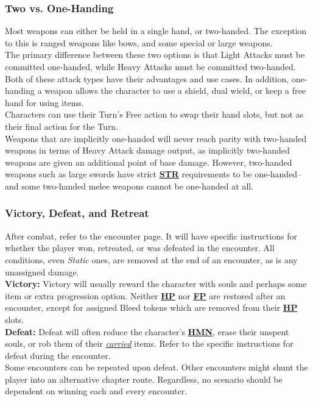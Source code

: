 \documentclass[12pt]{article}
\newcommand{\refto}[1]{\hyperlink{#1}{\textbf{#1}}}
\newcommand{\reftoit}[1]{\hyperlink{#1}{\emph{#1}}}
\begin{document}
\begin{multicols*}{2}
\subsubsection{Two vs. One-Handing}
Most weapons can either be held in a single hand, or two-handed. The exception to this is ranged weapons like bows, and some special or large weapons.\\
The primary difference between these two options is that Light Attacks must be committed one-handed, while Heavy Attacks must be committed two-handed. Both of these attack types have their advantages and use cases. In addition, one-handing a weapon allows the character to use a shield, dual wield, or keep a free hand for using items.\\
Characters can use their Turn’s Free action to swap their hand slots, but not as their final action for the Turn.\\
Weapons that are implicitly one-handed will never reach parity with two-handed weapons in terms of Heavy Attack damage output, as implicitly two-handed weapons are given an additional point of base damage. However, two-handed weapons such as large swords have strict \refto{STR} requirements to be one-handed--and some two-handed melee weapons cannot be one-handed at all.

\subsubsection{Victory, Defeat, and Retreat}
After combat, refer to the encounter page. It will have specific instructions for whether the player won, retreated, or was defeated in the encounter. All conditions, even \emph{Static} ones, are removed at the end of an encounter, as is any unassigned damage.\\

\textbf{Victory:} Victory will usually reward the character with souls and perhaps some item or extra progression option. Neither \refto{HP} nor \refto{FP} are restored after an encounter, except for assigned Bleed tokens which are removed from their \refto{HP} slots.\\

\textbf{Defeat:} Defeat will often reduce the character’s \refto{HMN}, erase their unspent souls, or rob them of their \reftoit{carried} items. Refer to the specific instructions for defeat during the encounter.\\
Some encounters can be repeated upon defeat. Other encounters might shunt the player into an alternative chapter route. Regardless, no scenario should be dependent on winning each and every encounter.\\


\end{multicols*}
\end{document}
